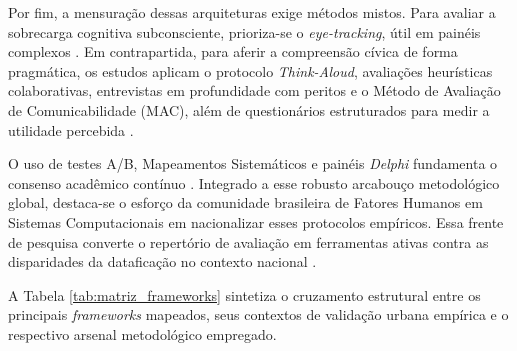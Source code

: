 \documentclass[12pt]{article}
\begin{document}
{{    Por fim, a mensuração dessas arquiteturas exige métodos mistos. Para avaliar a sobrecarga cognitiva subconsciente, prioriza-se o \textit{eye-tracking}, útil em painéis complexos \cite{Capeleti2024Human, kaufmann2021ethical}. Em contrapartida, para aferir a compreensão cívica de forma pragmática, os estudos aplicam o protocolo \textit{Think-Aloud}, avaliações heurísticas colaborativas, entrevistas em profundidade com peritos e o Método de Avaliação de Comunicabilidade (MAC), além de questionários estruturados para medir a utilidade percebida \cite{Strey2019Human, Belizario2023Interacao, Capeleti2024Human}. 

    O uso de testes A/B, Mapeamentos Sistemáticos e painéis \textit{Delphi} fundamenta o consenso acadêmico contínuo \cite{calvetti2024human, hayes2024making, Refat2023}. Integrado a esse robusto arcabouço metodológico global, destaca-se o esforço da comunidade brasileira de Fatores Humanos em Sistemas Computacionais em nacionalizar esses protocolos empíricos. Essa frente de pesquisa converte o repertório de avaliação em ferramentas ativas contra as disparidades da dataficação no contexto nacional \cite{Capeleti2024Human, Strey2019Human, Belizario2023Interacao}.

    A Tabela \ref{tab:matriz_frameworks} sintetiza o cruzamento estrutural entre os principais \textit{frameworks} mapeados, seus contextos de validação urbana empírica e o respectivo arsenal metodológico empregado.


}}
\end{document}
